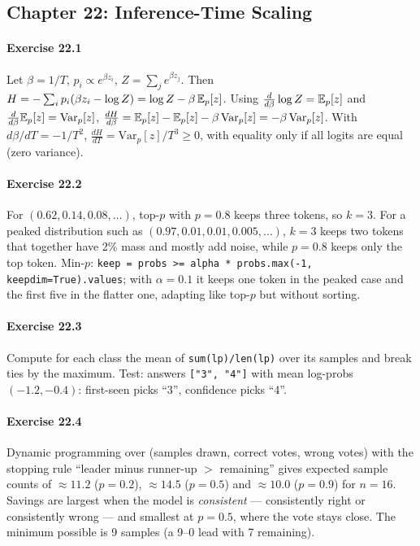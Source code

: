 \subsection*{Chapter 22: Inference-Time Scaling}

\paragraph{Exercise 22.1} Let $\beta = 1/T$, $p_i \propto e^{\beta z_i}$, $Z = \sum_j e^{\beta z_j}$.
Then $H = -\sum_i p_i(\beta z_i - \log Z) = \log Z - \beta\,\mathbb{E}_p[z]$. Using
$\frac{d}{d\beta}\log Z = \mathbb{E}_p[z]$ and $\frac{d}{d\beta}\mathbb{E}_p[z] = \mathrm{Var}_p[z]$,
$\frac{dH}{d\beta} = \mathbb{E}_p[z] - \mathbb{E}_p[z] - \beta\,\mathrm{Var}_p[z] = -\beta\,\mathrm{Var}_p[z]$.
With $d\beta/dT = -1/T^2$, $\frac{dH}{dT} = \mathrm{Var}_p[z]/T^3 \ge 0$, with equality only if all
logits are equal (zero variance).

\paragraph{Exercise 22.2} For $(0.62, 0.14, 0.08, \dots)$, top-$p$ with $p = 0.8$ keeps three tokens,
so $k = 3$. For a peaked distribution such as $(0.97, 0.01, 0.01, 0.005, \dots)$, $k = 3$ keeps two
tokens that together have 2\% mass and mostly add noise, while $p = 0.8$ keeps only the top token.
Min-$p$: \texttt{keep = probs >= alpha * probs.max(-1, keepdim=True).values}; with $\alpha = 0.1$ it
keeps one token in the peaked case and the first five in the flatter one, adapting like top-$p$ but
without sorting.

\paragraph{Exercise 22.3} Compute for each class the mean of \texttt{sum(lp)/len(lp)} over its
samples and break ties by the maximum. Test: answers \texttt{["3", "4"]} with mean log-probs
$(-1.2, -0.4)$: first-seen picks ``3'', confidence picks ``4''.

\paragraph{Exercise 22.4} Dynamic programming over (samples drawn, correct votes, wrong votes) with
the stopping rule ``leader minus runner-up $>$ remaining'' gives expected sample counts of
$\approx 11.2$ ($p = 0.2$), $\approx 14.5$ ($p = 0.5$) and $\approx 10.0$ ($p = 0.9$) for $n = 16$.
Savings are largest when the model is \emph{consistent} --- consistently right or consistently wrong
--- and smallest at $p = 0.5$, where the vote stays close. The minimum possible is 9 samples (a 9--0
lead with 7 remaining).

